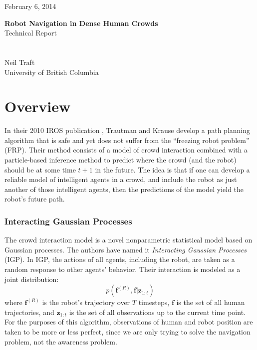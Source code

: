 \documentclass[a4paper,11pt,headings=small]{article}
\begin{document}
  \vspace{-1cm}
	\begin{flushright}
	February 6, 2014\\
	\end{flushright}
	\vspace{0.6cm}
	\LARGE{\textbf{Robot Navigation in Dense Human Crowds}\\[0.2cm] Technical Report}\\\\ \\
	\large{Neil Traft\\[0.1cm] University of British Columbia}		 	 	\vspace{0.6cm}


\pagestyle{fancy}
\fancyhf{}

\setcounter{page}{1}

\renewcommand{\thesection}{\Roman{section}}
\thispagestyle{empty}

\newcommand{\f}{\mathbf{f}}
\newcommand{\fr}{\f^{(R)}}
\newcommand{\fati}{\f^{(i)}}
\newcommand{\fatj}{\f^{(j)}}
\newcommand{\samplej}{(\fatj)_i}
\newcommand{\z}{\mathbf{z}}
\newcommand{\ztot}{\z_{1:t}}
\newcommand{\pos}{\mathrm{pos}}
\newcommand{\post}{\pos^{(i)}_t}

\section*{Overview}
\quad In their 2010 IROS publication \cite{Trautman2010}, Trautman and Krause develop a path planning algorithm that is safe and yet does not suffer from the ``freezing robot problem'' (FRP). Their method consists of a model of crowd interaction combined with a particle-based inference method to predict where the crowd (and the robot) should be at some time $t+1$ in the future. The idea is that if one can develop a reliable model of intelligent agents in a crowd, and include the robot as just another of those intelligent agents, then the predictions of the model yield the robot's future path.

\subsubsection*{Interacting Gaussian Processes}
The crowd interaction model is a novel nonparametric statistical model based on Gaussian processes. The authors have named it \emph{Interacting Gaussian Processes} (IGP). In IGP, the actions of all agents, including the robot, are taken as a random response to other agents' behavior. Their interaction is modeled as a joint distribution:
$$p(\fr,\f|\ztot)$$
where $\fr$ is the robot's trajectory over $T$ timesteps, $\f$ is the set of all human trajectories, and $\ztot$ is the set of all observations up to the current time point. For the purposes of this algorithm, observations of human and robot position are taken to be more or less perfect, since we are only trying to solve the navigation problem, not the awareness problem.
\end{document}
